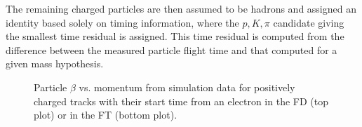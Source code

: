     The remaining charged particles are then assumed to be hadrons and assigned an identity based solely on timing information, where the $p,K,\pi$ candidate giving the smallest time residual is assigned.
    This time residual is computed from the difference between the measured particle flight time and that computed for a given mass hypothesis.

    \begin{figure}
        \centering{}
        \caption[Particle $\beta$ vs. momentum for positively charged tracks.]{Particle $\beta$ vs. momentum from simulation data for positively charged tracks with their start time from an electron in the FD (top plot) or in the FT (bottom plot).}
        \label{fig::pos_pid}
    \end{figure}

